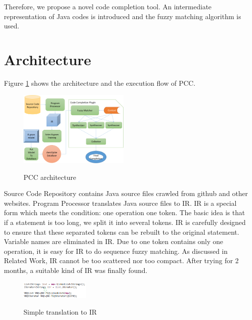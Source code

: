 \documentclass{sig-alternate-05-2015}
\begin{document}
Therefore, we propose a novel code completion tool. An intermediate representation of Java codes is introduced and the fuzzy matching algorithm is used.

\section{Architecture}

Figure \ref{architecture} shows the architecture and the execution flow of PCC.
\vspace{-0.25cm}
\\\begin{figure}[htbp]
  \centering
  \includegraphics[width=0.48\textwidth]{pics/architecture.png}\\
  \caption{PCC architecture}\label{architecture}
\end{figure}

Source Code Repository contains Java source files crawled from github and other websites. Program Processor translates Java source files to IR. IR is a special form which meets the condition: one operation one token. The basic idea is that if a statement is too long, we split it into several tokens. IR is carefully designed to ensure that these separated tokens can be rebuilt to the original statement. Variable names are eliminated in IR. Due to one token contains only one operation, it is easy for IR to do sequence fuzzy matching. As discussed in Related Work, IR cannot be too scattered nor too compact. After trying for 2 months, a suitable kind of IR was finally found.
\vspace{-0.25cm}
\\\begin{figure}[htbp]
  \centering
  \includegraphics[width=0.3\textwidth]{pics/toIR1.png}\\
  \vspace{-0.15cm}
  \caption{Simple translation to IR}\label{toIR1}
\end{figure}
\end{document}
